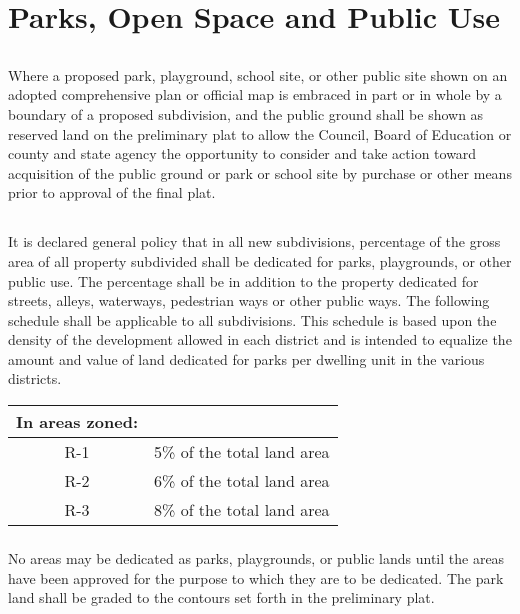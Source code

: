 \section{Parks, Open Space and Public Use}
\subsection{}
Where a proposed park, playground, school site, or other public site shown on an adopted comprehensive plan or official map is embraced in part or in whole by a boundary of a proposed subdivision, and the public ground shall be shown as reserved land on the preliminary plat to allow the Council, Board of Education or county and state agency the opportunity to consider and take action toward acquisition of the public ground or park or school site by purchase or other means prior to approval of the final plat.
\subsection{}
It is declared general policy that in all new subdivisions, percentage of the gross area of all property subdivided shall be dedicated for parks, playgrounds, or other public use. The percentage shall be in addition to the property dedicated for streets, alleys, waterways, pedestrian ways or other public ways. The following schedule shall be applicable to all subdivisions. This schedule is based upon the density of the development allowed in each district and is intended to equalize the amount and value of land dedicated for parks per dwelling unit in the various districts.
\begin{center}
    \begin{tabular}{|c|c|}
        \hline
        \textbf{In areas zoned:} & \\
        \hline
        R-1 & 5\% of the total land area\\
        \hline
        R-2 & 6\% of the total land area\\
        \hline
        R-3 & 8\% of the total land area\\
        \hline
    \end{tabular}
\end{center}
\subsubsection{}
No areas may be dedicated as parks, playgrounds, or public lands until the areas have been approved for the purpose to which they are to be dedicated. The park land shall be graded to the contours set forth in the preliminary plat.
